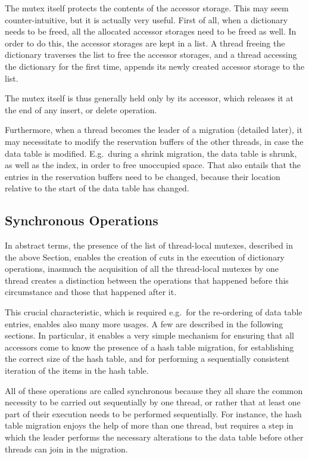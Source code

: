 The mutex itself protects the contents of the accessor storage.
This may seem counter-intuitive, but it is actually very useful.
First of all, when a dictionary needs to be freed, all the allocated accessor storages need to be freed as well.
In order to do this, the accessor storages are kept in a list.
A thread freeing the dictionary traverses the list to free the accessor storages, and a thread accessing the dictionary for the first time, appends its newly created accessor storage to the list.

The mutex itself is thus generally held only by its accessor, which releases it at the end of any insert, or delete operation.

Furthermore, when a thread becomes the leader of a migration (detailed later), it may necessitate to modify the reservation buffers of the other threads, in case the data table is modified.
E.g.\ during a shrink migration, the data table is shrunk, as well as the index, in order to free unoccupied space.
That also entails that the entries in the reservation buffers need to be changed, because their location relative to the start of the data table has changed.


\subsection{Synchronous Operations}\label{subsec:synchronous-operations}

In abstract terms, the presence of the list of thread-local mutexes, described in the above Section, enables the creation of cuts in the execution of dictionary operations, inasmuch the acquisition of all the thread-local mutexes by one thread creates a distinction between the operations that happened before this circumstance and those that happened after it.

This crucial characteristic, which is required e.g.\ for the re-ordering of data table entries, enables also many more usages.
A few are described in the following sections.
In particular, it enables a very simple mechanism for ensuring that all accessors come to know the presence of a hash table migration, for establishing the correct size of the hash table, and for performing a sequentially consistent iteration of the items in the hash table.

All of these operations are called synchronous because they all share the common necessity to be carried out sequentially by one thread, or rather that at least one part of their execution needs to be performed sequentially.
For instance, the hash table migration enjoys the help of more than one thread, but requires a step in which the leader performs the necessary alterations to the data table before other threads can join in the migration.

